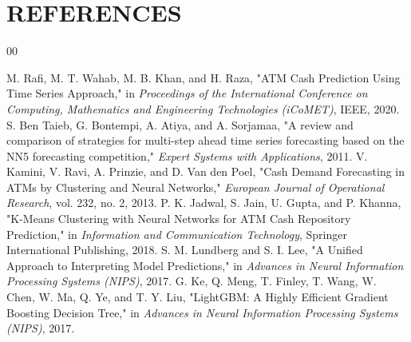 \documentclass[conference, 12pt, onecolumn]{IEEEtran}
\begin{document}
\clearpage %

\section{REFERENCES}
\begin{thebibliography}{00}
\normalsize %

 M. Rafi, M. T. Wahab, M. B. Khan, and H. Raza, "ATM Cash Prediction Using Time Series Approach," in \textit{Proceedings of the International Conference on Computing, Mathematics and Engineering Technologies (iCoMET)}, IEEE, 2020.
 S. Ben Taieb, G. Bontempi, A. Atiya, and A. Sorjamaa, "A review and comparison of strategies for multi-step ahead time series forecasting based on the NN5 forecasting competition," \textit{Expert Systems with Applications}, 2011.
 V. Kamini, V. Ravi, A. Prinzie, and D. Van den Poel, "Cash Demand Forecasting in ATMs by Clustering and Neural Networks," \textit{European Journal of Operational Research}, vol. 232, no. 2, 2013.
 P. K. Jadwal, S. Jain, U. Gupta, and P. Khanna, "K-Means Clustering with Neural Networks for ATM Cash Repository Prediction," in \textit{Information and Communication Technology}, Springer International Publishing, 2018.
 S. M. Lundberg and S. I. Lee, "A Unified Approach to Interpreting Model Predictions," in \textit{Advances in Neural Information Processing Systems (NIPS)}, 2017.
 G. Ke, Q. Meng, T. Finley, T. Wang, W. Chen, W. Ma, Q. Ye, and T. Y. Liu, "LightGBM: A Highly Efficient Gradient Boosting Decision Tree," in \textit{Advances in Neural Information Processing Systems (NIPS)}, 2017.
\end{thebibliography}
\end{document}

